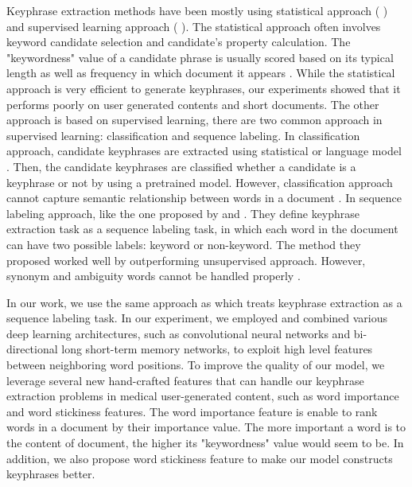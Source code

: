 Keyphrase extraction methods have been mostly using statistical approach (\cite{sparck1972statistical} \cite{zhang2007comparative} \cite{rake} \cite{mihalcea2004textrank}) and supervised learning approach (\cite{witten1999kea} \cite{medelyan2009human} \cite{marujoMAUI}). The statistical approach often involves keyword candidate selection and candidate's property calculation. The "keywordness" value of a candidate phrase is usually scored based on its typical length as well as frequency in which document it appears \cite{rake}. While the statistical approach is very efficient to generate keyphrases, our experiments showed that it performs poorly on user generated contents and short documents. The other approach is based on supervised learning, there are two common approach in supervised learning: classification and sequence labeling. In classification approach, candidate keyphrases are extracted using statistical \cite{sparck1972statistical} or language model \cite{ekpNeuralNetworks}. Then, the candidate keyphrases are classified whether a candidate is a keyphrase or not by using a pretrained model. However, classification approach cannot capture semantic relationship between words in a document \cite{surveyPopulerTerbaruEkp}.  In sequence labeling approach,  like the one proposed by \cite{cao2010automatically} and \cite{zhang2008automatic}. They define keyphrase extraction task as a sequence labeling task, in which each word in the document can have two possible labels: keyword or non-keyword. The method they proposed worked well by outperforming unsupervised approach. However, synonym and ambiguity words cannot be handled properly \cite{zhang2008automatic}.

In our work, we use the same approach as \cite{cao2010automatically} which treats keyphrase extraction as a sequence labeling task. In our experiment, we employed and combined various deep learning architectures, such as convolutional neural networks and bi-directional long short-term memory networks, to exploit high level features between neighboring word positions. To improve the quality of our model, we leverage several new hand-crafted features that can handle our keyphrase extraction problems in medical user-generated content, such as word importance and word stickiness features. The word importance feature is enable to rank words in a document by their importance value. The more important a word is to the content of document, the higher its "keywordness" value would seem to be. In addition, we also propose word stickiness feature to make our model constructs keyphrases better. 

